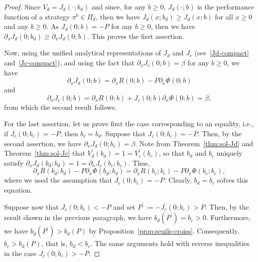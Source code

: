 \documentclass[10pt,a4paper]{amsart}
\newcommand{\delx}{\partial_x}
\renewcommand{\geq}{\geqslant}
\begin{document}
\begin{proof}
Since $V_d = J_d(\cdot;b_d)$ and since, for any $b\geq 0$, $J_d(\cdot;b)$ is the performance function of a strategy $\pi^b \in \Pi_d$, then we have $J_d(x;b_d) \geq J_d(x;b)$ for all $x \geq 0$ and any $b\geq 0$. As $J_d(0;b)=-P$ for any $b \geq 0$, then we have $\delx J_d(0;b_d) \geq \delx J_d(0;b)$. This proves the first assertion.
    
Now, using the unified analytical representations of $J_d$ and $J_c$ (see~\eqref{Jd-compact} and~\eqref{Jc-compact}), and using the fact that $\delx J_c(0;b)=\beta$ for any $b \geq 0$, we have
\begin{equation}
\delx J_d(0;b) = \delx R(0;b) - P \delx\Phi(0;b)
\end{equation}
and
\begin{equation}
\delx J_c(0;b) = \delx R(0;b) + J_c(0;b) \delx\Phi(0;b) = \beta ,
\end{equation}
from which the second result follows.
    
For the last assertion, let us prove first the case corresponding to an equality, i.e., if $J_c(0;b_c) = -P$, then $b_c=b_d$. Suppose that $J_c(0;b_c) = -P$. Then, by the second assertion, we have $\delx J_d(0;b_c) =\beta$. Note from Theorem~\ref{thm:sol-Jd} and Theorem~\ref{thm:sol-Jc} that $V^\prime_d(b_d) = 1 = V^\prime_c(b_c)$, so that $b_d$ and $b_c$ uniquely satisfy $\delx J_d(b_d;b_d) = 1 = \delx J_c(b_c;b_c)$. Thus,
\begin{equation}
\delx R(b_d;b_d) - P\delx\Phi(b_d;b_d) = \delx R(b_c;b_c) - P\delx\Phi(b_c;b_c),  
\end{equation}
where we used the assumption that $J_c(0;b_c) = -P$. Clearly, $b_d = b_c$ solves this equation.
    
Suppose now that $J_c(0;b_c) < -P$ and set $P^\prime := -J_c(0;b_c) > P$. Then, by the result shown in the previous paragraph, we have $b_d(P^\prime)=b_c > 0$. Furthermore, we have $b_d(P^\prime) > b_d(P)$ by Proposition~\ref{prop:seuils-croiss}. Consequently, $b_c > b_d(P)$, that is, $b_d<b_c$. The same arguments hold with reverse inequalities in the case $J_c(0;b_c) > -P$.
\end{proof}
\end{document}
